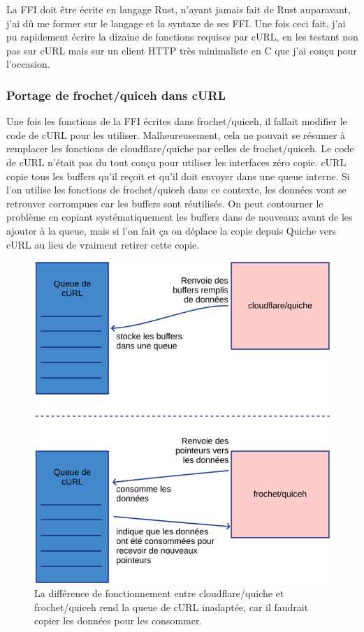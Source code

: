 La FFI doit être écrite en langage Rust, n'ayant jamais fait de Rust auparavant, j'ai dû me former sur le langage et la syntaxe de ses FFI. Une fois ceci fait, j'ai pu rapidement écrire la dizaine de fonctions requises par cURL, en les testant non pas sur cURL mais sur un client HTTP très minimaliste en C que j'ai conçu pour l'occasion.

\subsubsection{Portage de frochet/quiceh dans cURL}

Une fois les fonctions de la FFI écrites dans frochet/quiceh, il fallait modifier le code de cURL pour les utiliser.
Malheureusement, cela ne pouvait se résumer à remplacer les fonctions de cloudflare/quiche par celles de frochet/quiceh. Le code de cURL n'était pas du tout conçu pour utiliser les interfaces zéro copie.
cURL copie tous les buffers qu'il reçoit et qu'il doit envoyer dans une queue interne. Si l'on utilise les fonctions de frochet/quiceh dans ce contexte, les données vont se retrouver corrompues car les buffers sont réutilisés.
On peut contourner le problème en copiant systématiquement les buffers dans de nouveaux avant de les ajouter à la queue, mais si l'on fait ça on déplace la copie depuis Quiche vers cURL au lieu de vraiment retirer cette copie.

\begin{figure}[H]
    \centering
    \includegraphics[height=0.37\textheight]{figures/curl_queue.png}
    \caption{\small{La différence de fonctionnement entre cloudflare/quiche et frochet/quiceh rend la queue de cURL inadaptée, car il faudrait copier les données pour les consommer.}}
\end{figure}

